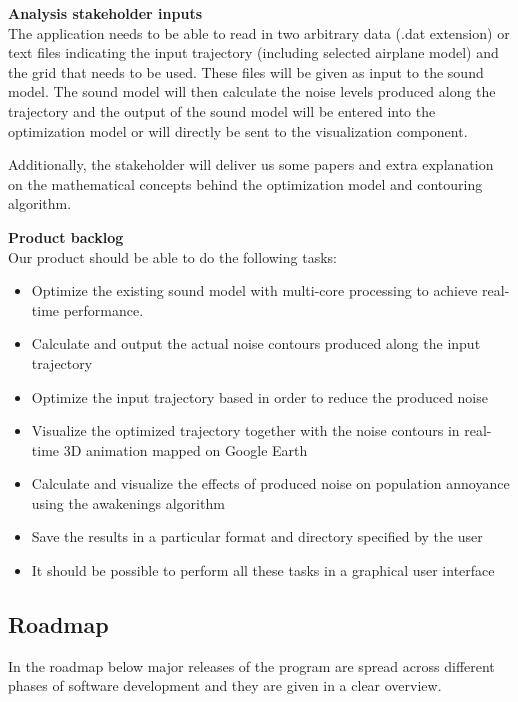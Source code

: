 \documentclass[a4paper,english,fleqn]{exam}
\begin{document}
\textbf{Analysis stakeholder inputs} \\
The application needs to be able to read in two arbitrary data (.dat extension) or text files indicating the input trajectory (including selected airplane model) and the grid that needs to be used. These files will be given as input to the sound model. The sound model will then calculate the noise levels produced along the trajectory and the output of the sound model will be entered into the optimization model or will directly be sent to the visualization component.

Additionally, the stakeholder will deliver us some papers and extra explanation on the mathematical concepts behind the optimization model and contouring algorithm.

\textbf{Product backlog} \\
Our product should be able to do the following tasks:

\begin{itemize}
\item Optimize the existing sound model with multi-core processing to achieve real-time performance.
\item Calculate and output the actual noise contours produced along the input trajectory
\item Optimize the input trajectory based in order to reduce the produced noise 
\item Visualize the optimized trajectory together with the noise contours in real-time 3D animation mapped on Google Earth
\item Calculate and visualize the effects of produced noise on population annoyance using the awakenings algorithm
\item Save the results in a particular format and directory specified by the user
\item It should be possible to perform all these tasks in a graphical user interface
\end{itemize}

\newpage 

\subsection{Roadmap}
In the roadmap below major releases of the program are spread across different phases of software development and they are given in a clear overview. \\
\end{document}
